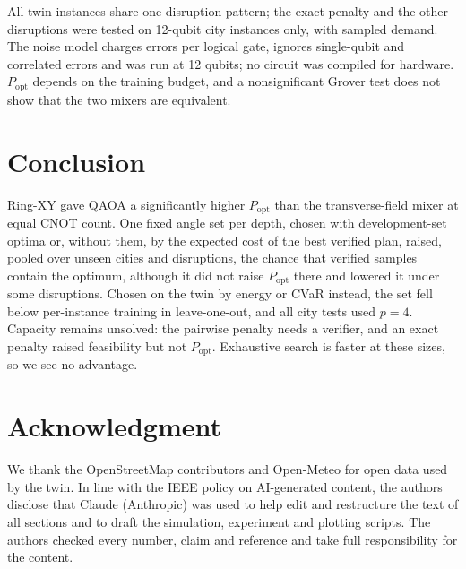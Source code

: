 \documentclass[conference]{IEEEtran}
\begin{document}
All twin instances share one disruption pattern; the exact penalty and the other disruptions were tested on 12-qubit city instances only, with sampled demand. The noise model charges errors per logical gate, ignores single-qubit and correlated errors and was run at 12 qubits; no circuit was compiled for hardware. $P_{\mathrm{opt}}$ depends on the training budget, and a nonsignificant Grover test does not show that the two mixers are equivalent.

\section{Conclusion}
Ring-XY gave QAOA a significantly higher $P_{\mathrm{opt}}$ than the transverse-field mixer at equal CNOT count. One fixed angle set per depth, chosen with development-set optima or, without them, by the expected cost of the best verified plan, raised, pooled over unseen cities and disruptions, the chance that \Shots{} verified samples contain the optimum, although it did not raise $P_{\mathrm{opt}}$ there and lowered it under some disruptions. Chosen on the twin by energy or CVaR instead, the set fell below per-instance training in leave-one-out, and all city tests used $p=4$. Capacity remains unsolved: the pairwise penalty needs a verifier, and an exact penalty raised feasibility but not $P_{\mathrm{opt}}$. Exhaustive search is faster at these sizes, so we see no advantage.

\section*{Acknowledgment}
We thank the OpenStreetMap contributors and Open-Meteo for open data used by the twin.
In line with the IEEE policy on AI-generated content, the authors disclose that Claude (Anthropic) was used to help edit and restructure the text of all sections and to draft the simulation, experiment and plotting scripts. The authors checked every number, claim and reference and take full responsibility for the content.
\end{document}

